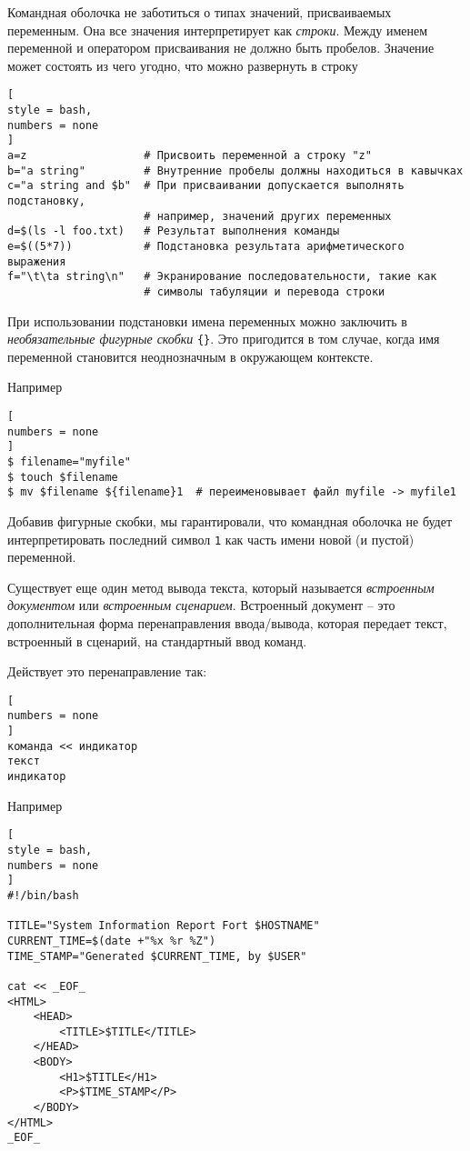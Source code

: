 \documentclass[%
	11pt,
	a4paper,
	utf8,
		]{article}
\begin{document}
Командная оболочка не заботиться о типах значений, присваиваемых переменным. Она все значения интерпретирует как \emph{строки}. Между именем переменной и оператором присваивания не должно быть пробелов. Значение может состоять из чего угодно, что можно развернуть в строку
\begin{lstlisting}[
style = bash,
numbers = none
]
a=z                  # Присвоить переменной a строку "z"
b="a string"         # Внутренние пробелы должны находиться в кавычках
c="a string and $b"  # При присваивании допускается выполнять подстановку,
                     # например, значений других переменных
d=$(ls -l foo.txt)   # Результат выполнения команды
e=$((5*7))           # Подстановка результата арифметического выражения
f="\t\ta string\n"   # Экранирование последовательности, такие как
                     # символы табуляции и перевода строки
\end{lstlisting}

При использовании подстановки имена переменных можно заключить в \emph{необязательные фигурные скобки} \verb|{}|. Это пригодится в том случае, когда имя переменной становится неоднозначным в окружающем контексте.

Например
\begin{lstlisting}[
numbers = none
]
$ filename="myfile"
$ touch $filename
$ mv $filename ${filename}1  # переименовывает файл myfile -> myfile1
\end{lstlisting}

Добавив фигурные скобки, мы гарантировали, что командная оболочка не будет интерпретировать последний символ \texttt{1} как часть имени новой (и пустой) переменной.

Существует еще один метод вывода текста, который называется \emph{встроенным документом} или \emph{встроенным сценарием}. Встроенный документ -- это дополнительная форма перенаправления ввода/вывода, которая передает текст, встроенный в сценарий, на стандартный ввод команд.

Действует это перенаправление так:
\begin{lstlisting}[
numbers = none
]
команда << индикатор
текст
индикатор
\end{lstlisting}

Например
\begin{lstlisting}[
style = bash,
numbers = none
]
#!/bin/bash

TITLE="System Information Report Fort $HOSTNAME"
CURRENT_TIME=$(date +"%x %r %Z")
TIME_STAMP="Generated $CURRENT_TIME, by $USER"

cat << _EOF_
<HTML>
    <HEAD>
        <TITLE>$TITLE</TITLE>
    </HEAD>
    <BODY>
        <H1>$TITLE</H1>
        <P>$TIME_STAMP</P>
    </BODY>
</HTML>
_EOF_
\end{lstlisting}
\end{document}
